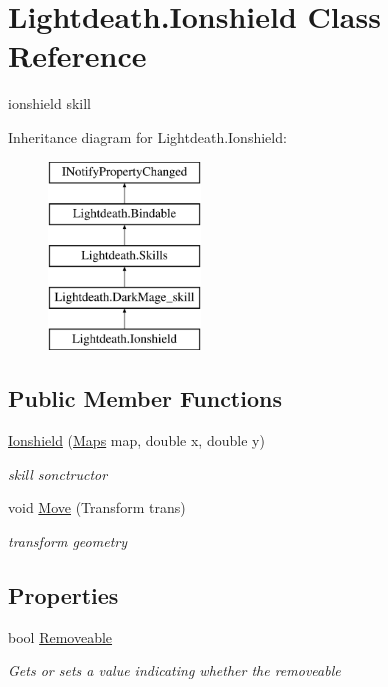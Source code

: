 \hypertarget{class_lightdeath_1_1_ionshield}{}\section{Lightdeath.\+Ionshield Class Reference}
\label{class_lightdeath_1_1_ionshield}


ionshield skill  


Inheritance diagram for Lightdeath.\+Ionshield\+:\begin{figure}[H]
\begin{center}
\leavevmode
\includegraphics[height=5.000000cm]{class_lightdeath_1_1_ionshield}
\end{center}
\end{figure}
\subsection*{Public Member Functions}
\begin{DoxyCompactItemize}
\item 
\hyperlink{class_lightdeath_1_1_ionshield_a67459ea24604cd33a3ed67daed419ffb}{Ionshield} (\hyperlink{class_lightdeath_1_1_maps}{Maps} map, double x, double y)
\begin{DoxyCompactList}\small\item\em skill sonctructor \end{DoxyCompactList}\item 
void \hyperlink{class_lightdeath_1_1_ionshield_af3bb6e341520f2808be047331ca32893}{Move} (Transform trans)
\begin{DoxyCompactList}\small\item\em transform geometry \end{DoxyCompactList}\end{DoxyCompactItemize}
\subsection*{Properties}
\begin{DoxyCompactItemize}
\item 
bool \hyperlink{class_lightdeath_1_1_ionshield_a22fd3ab45846892222735636dc719bb9}{Removeable}
\begin{DoxyCompactList}\small\item\em Gets or sets a value indicating whether the removeable \end{DoxyCompactList}\end{DoxyCompactItemize}
